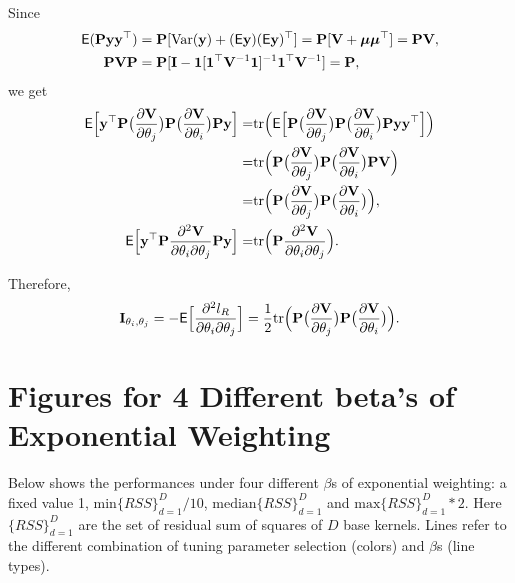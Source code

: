 \documentclass[article]{jss}
\begin{document}
\begin{appendix}
Since 
\begin{align*}
\mathsf{E}({\bf P} {\bf y} {\bf y}^\top )&={\bf P} [\mbox{Var}({\bf y})+(\mathsf{E}{\bf y})(\mathsf{E}{\bf y})^\top ]={\bf P} [{\bf V}+\boldsymbol{\mu} \boldsymbol{\mu}^\top ]={\bf P} {\bf V}, \\
{\bf P} {\bf V} {\bf P}&={\bf P}[{\bf I}-\mathbf{1}[\mathbf{1}^\top {\bf V}^{-1}\mathbf{1}]^{-1}\mathbf{1}^\top {\bf V}^{-1}]={\bf P},
\end{align*}
we get
\begin{align*}
\mathsf{E}\Big[{\bf y}^\top  {\bf P}\big(\frac{\partial {\bf V}}{\partial \theta_j}\big){\bf P} \big(\frac{\partial {\bf V}}{\partial \theta_i}\big){\bf P} {\bf y} \Big]=&\mbox{tr}\Big(\mathsf{E}\Big[{\bf P}\big(\frac{\partial {\bf V}}{\partial \theta_j}\big){\bf P} \big(\frac{\partial {\bf V}}{\partial \theta_i}\big){\bf P} {\bf y} {\bf y}^\top  \Big] \Big)\\
=&\mbox{tr}\Big({\bf P}\big(\frac{\partial {\bf V}}{\partial \theta_j}\big){\bf P} \big(\frac{\partial {\bf V}}{\partial \theta_i}\big){\bf P} {\bf V} \Big)\\
=&\mbox{tr}\Big({\bf P}\big(\frac{\partial {\bf V}}{\partial \theta_j}\big){\bf P} \big(\frac{\partial {\bf V}}{\partial \theta_i}\big)\Big),\\
\mathsf{E}\Big[{\bf y}^\top  {\bf P}\frac{\partial^2 {\bf V}}{\partial \theta_i \partial \theta_j}{\bf P} {\bf y} \Big]=&\mbox{tr}\Big({\bf P}\frac{\partial^2 {\bf V}}{\partial \theta_i \partial \theta_j}\Big).
\end{align*}

Therefore, 
\begin{align*}
{\bf I}_{\theta_i, \theta_j}=-\mathsf{E}\Big[\frac{\partial^2 l_R}{\partial \theta_i \partial \theta_j}\Big]=\frac{1}{2}\mbox{tr}\Big({\bf P}\big(\frac{\partial {\bf V}}{\partial \theta_j}\big){\bf P} \big(\frac{\partial {\bf V}}{\partial \theta_i}\big)\Big).
\end{align*}


\section{Figures for 4 Different beta's of Exponential Weighting}
Below shows the performances under four different $\beta$s of exponential weighting: a fixed value 1, $\mbox{min}\{RSS\} _{d=1}^D/10$, $\mbox{median}\{RSS\} _{d=1}^D$ and $\mbox{max}\{RSS\} _{d=1}^D * 2$. Here $\{RSS\} _{d=1}^D$ are the set of residual sum of squares of $D$ base kernels. Lines refer to the different combination of tuning parameter selection (colors) and $\beta$s (line types).


\end{appendix}
\end{document}
